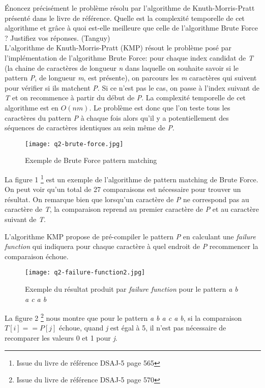 Énoncez précisément le problème résolu par l’algorithme de Knuth-Morris-Pratt
présenté dans le livre de référence. Quelle est la complexité temporelle de cet algorithme et grâce à quoi est-elle meilleure que celle de l’algorithme Brute Force ?
Justifiez vos réponses. (Tanguy)
\\

L'algorithme de Knuth-Morris-Pratt (KMP) résout le problème posé par l'implémentation de l'algorithme Brute Force: pour chaque index candidat de \textit{T} (la chaine de caractères de longueur \textit{n} dans laquelle on souhaite savoir si le pattern \textit{P}, de longueur \textit{m}, est présente), on parcours les \textit{m} caractères qui suivent pour vérifier si ils matchent \textit{P}. Si ce n'est pas le cas, on passe à l'index suivant de \textit{T} et on recommence à partir du début de \textit{P}.
La complexité temporelle de cet algorithme est en $O(n m)$.
Le problème est donc que l'on teste tous les caractères du pattern \textit{P} à chaque fois alors qu'il y a potentiellement des séquences de caractères identiques au sein même de \textit{P}.\\
\begin{figure}[h]
	\centering
	\texttt{[image: q2-brute-force.jpg]}
	\caption{Exemple de Brute Force pattern matching}
	\label{fig:bruteforce}
\end{figure}
La figure 1 %
\footnote{Issue du livre de référence DSAJ-5 page 565} est un exemple de l'algorithme de pattern matching de Brute Force. On peut voir qu'un total de 27 comparaisons est nécessaire pour trouver un résultat. On remarque bien que lorsqu'un caractère de \textit{P} ne correspond pas au caractère de \textit{T}, la comparaison reprend au premier caractère de \textit{P} et au caractère suivant de \textit{T}.
			 

L'algorithme KMP propose de pré-compiler le pattern \textit{P} en calculant une \textit{failure function} qui indiquera pour chaque caractère à quel endroit de \textit{P} recommencer la comparaison échoue.
\begin{figure}[h]
	\centering
	\texttt{[image: q2-failure-function2.jpg]}
	\caption{Exemple du résultat produit par \textit{failure function} pour le pattern \textit{a b a c a b}}
	\label{fig:failurefunction}
\end{figure}
La figure 2 %
\footnote{Issue du livre de référence DSAJ-5 page 570} nous montre que pour le pattern \textit{a b a c a b}, si la comparaison $T[i] == P[j]$ échoue, quand \textit{j} est égal à 5, il n'est pas nécessaire de recomparer les valeurs 0 et 1 pour \textit{j}.

